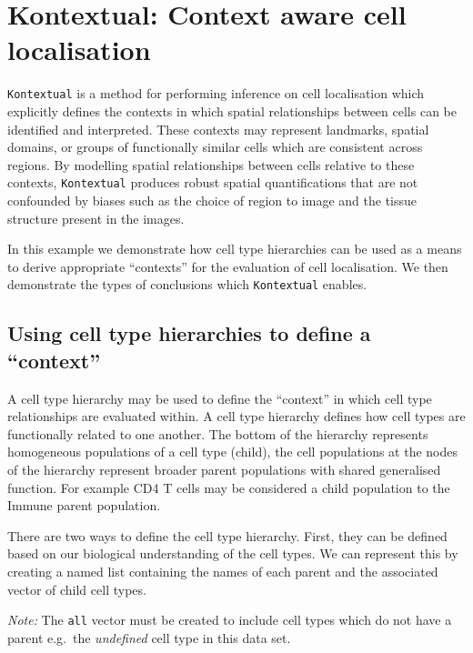\documentclass[
  letterpaper,
  DIV=11,
  numbers=noendperiod]{scrreprt}
\newenvironment{Shaded}{\begin{snugshade}}{\end{snugshade}}
\newcommand{\CommentTok}[1]{\textcolor[rgb]{0.37,0.37,0.37}{#1}}
\newcommand{\FunctionTok}[1]{\textcolor[rgb]{0.28,0.35,0.67}{#1}}
\newcommand{\NormalTok}[1]{\textcolor[rgb]{0.00,0.23,0.31}{#1}}
\newcommand{\SpecialCharTok}[1]{\textcolor[rgb]{0.37,0.37,0.37}{#1}}
\begin{document}
\section{Kontextual: Context aware cell
localisation}\label{kontextual-context-aware-cell-localisation}

\texttt{Kontextual} is a method for performing inference on cell
localisation which explicitly defines the contexts in which spatial
relationships between cells can be identified and interpreted. These
contexts may represent landmarks, spatial domains, or groups of
functionally similar cells which are consistent across regions. By
modelling spatial relationships between cells relative to these
contexts, \texttt{Kontextual} produces robust spatial quantifications
that are not confounded by biases such as the choice of region to image
and the tissue structure present in the images.

In this example we demonstrate how cell type hierarchies can be used as
a means to derive appropriate ``contexts'' for the evaluation of cell
localisation. We then demonstrate the types of conclusions which
\texttt{Kontextual} enables.

\subsection{Using cell type hierarchies to define a
``context''}\label{using-cell-type-hierarchies-to-define-a-context}

A cell type hierarchy may be used to define the ``context'' in which
cell type relationships are evaluated within. A cell type hierarchy
defines how cell types are functionally related to one another. The
bottom of the hierarchy represents homogeneous populations of a cell
type (child), the cell populations at the nodes of the hierarchy
represent broader parent populations with shared generalised function.
For example CD4 T cells may be considered a child population to the
Immune parent population.

There are two ways to define the cell type hierarchy. First, they can be
defined based on our biological understanding of the cell types. We can
represent this by creating a named list containing the names of each
parent and the associated vector of child cell types.

\emph{Note:} The \texttt{all} vector must be created to include cell
types which do not have a parent e.g.~the \emph{undefined} cell type in
this data set.

\begin{Shaded}
\end{Shaded}
\end{document}
